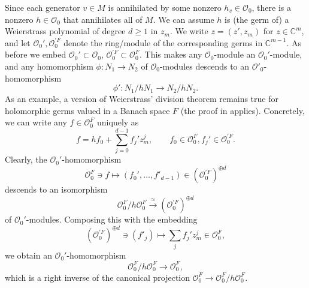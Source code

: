\documentclass{amsart}
\numberwithin{equation}{section}
\theoremstyle{definition}
\theoremstyle{plain}
\theoremstyle{remark}
\begin{document}
Since each generator $v\in M$ is annihilated by some nonzero $h_v\in{\ensuremath{\mathcal{{O}}}}_0$, there is a nonzero $h\in{\ensuremath{\mathcal{{O}}}}_0$ that annihilates all of $M$.
We can assume $h$ is (the germ of) a Weierstrass polynomial of degree
$d\geq 1$ in $z_m$. We write $z=(z',z_m)$ for $z\in\mathbb{C}^m$,
and let ${\ensuremath{\mathcal{{O}}}}_0', {\ensuremath{\mathcal{{O}}}}_0^{\prime F}$ denote the ring/module
of the corresponding germs in $\mathbb{C}^{m-1}$.
As before we embed ${\ensuremath{\mathcal{{O}}}}_0'\subset {\ensuremath{\mathcal{{O}}}}_0$,
${\ensuremath{\mathcal{{O}}}}_0^{\prime F}\subset{\ensuremath{\mathcal{{O}}}}_0^F$.
This makes any ${\ensuremath{\mathcal{{O}}}}_0$-module an ${\ensuremath{\mathcal{{O}}}}_0'$-module, and any
homomorphism $\phi:N_1\rightarrow N_2$ of ${\ensuremath{\mathcal{{O}}}}_0$-modules descends
to an ${\ensuremath{\mathcal{{O}}}}'_0$-homomorphism 
\begin{equation}\label{eq_proof_descend}
	\phi':N_1/hN_1\rightarrow N_2/h N_2.
\end{equation}
As an example, a version of Weierstrass' division theorem remains true
for holomorphic germs valued in a Banach space $F$ 
(the proof in \cite{GR} applies). Concretely, we can write any $f\in{\ensuremath{\mathcal{{O}}}}^F_0$
uniquely as 
\begin{equation}
\label{eq_proof_weierstrass_div}
f=hf_0+\sum_{j=0}^{d-1}f_j'z_m^j, \qquad f_0\in{\ensuremath{\mathcal{{O}}}}_0^F, f_j'\in{\ensuremath{\mathcal{{O}}}}_0^{\prime F}.
\end{equation}
Clearly, the ${\ensuremath{\mathcal{{O}}}}_0'$-homomorphism
\begin{equation}\label{eq_proof_weierstrass_div_map}
{\ensuremath{\mathcal{{O}}}}_0^F\ni f\mapsto (f_0',\ldots,f'_{d-1})\in({\ensuremath{\mathcal{{O}}}}_0^{\prime F})^{\oplus d}
\end{equation}
descends to an isomorphism
\begin{equation}
\label{eq_proof_weierstrass_iso}
{\ensuremath{\mathcal{{O}}}}_0^F/h{\ensuremath{\mathcal{{O}}}}_0^F\xrightarrow{\approx}({\ensuremath{\mathcal{{O}}}}_0^{\prime F})^{\oplus d}
\end{equation}
of ${\ensuremath{\mathcal{{O}}}}_0'$-modules. Composing this with the embedding
\begin{equation}\label{eq_proof_weierstrass_map}
({\ensuremath{\mathcal{{O}}}}_0^{\prime F})^{\oplus d}\ni (f'_j)\mapsto \sum_j f_j'z_m^j\in{\ensuremath{\mathcal{{O}}}}_0^F,
\end{equation}
we obtain an ${\ensuremath{\mathcal{{O}}}}_0'$-homomorphism
\begin{equation}\label{eq_proof_weierstrass_right_inverse}
{\ensuremath{\mathcal{{O}}}}_0^F/h{\ensuremath{\mathcal{{O}}}}_0^F\rightarrow{\ensuremath{\mathcal{{O}}}}_0^F,
\end{equation}
which is a right inverse of the canonical projection ${\ensuremath{\mathcal{{O}}}}_0^F\rightarrow{\ensuremath{\mathcal{{O}}}}_0^F/h{\ensuremath{\mathcal{{O}}}}_0^F$.
\end{document}
